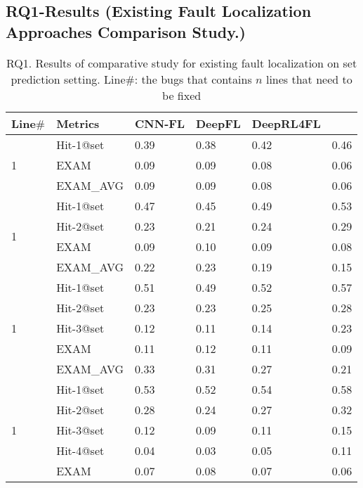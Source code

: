 \subsection{RQ1-Results ({\bf Existing Fault Localization Approaches Comparison Study.})}

\begin{table}[h]
	\caption{RQ1. Results of comparative study for existing fault localization on set prediction setting. Line$\#$: the bugs that contains $n$ lines that need to be fixed}
	{\small
		\begin{center}
			\renewcommand{\arraystretch}{1}
			\begin{tabular}{p{0.5cm}<{\centering}|p{1.5cm}<{\centering}|p{1cm}<{\centering}|p{0.8cm}<{\centering}|p{1.2cm}<{\centering}|p{1.2cm}<{\centering}}
				\hline
				Line$\#$ & Metrics & CNN-FL & DeepFL & DeepRL4FL & \tool \\
				\hline
				\multirow{3}{*}{1}   & Hit-1@set     & 0.39 & 0.38 & 0.42 & 0.46 \\
							    	 & EXAM          & 0.09 & 0.09 & 0.08 & 0.06 \\
									 & EXAM\_AVG     & 0.09 & 0.09 & 0.08 & 0.06 \\
				\hline
				\multirow{4}{*}{1}  & Hit-1@set     & 0.47 & 0.45 & 0.49 & 0.53 \\
									& Hit-2@set     & 0.23 & 0.21 & 0.24 & 0.29 \\
								   	& EXAM          & 0.09 & 0.10 & 0.09 & 0.08 \\
			                     	& EXAM\_AVG     & 0.22 & 0.23 & 0.19 & 0.15 \\
				\hline
				\multirow{5}{*}{1}  & Hit-1@set     & 0.51 & 0.49 & 0.52 & 0.57 \\
									& Hit-2@set     & 0.23 & 0.23 & 0.25 & 0.28 \\
									& Hit-3@set     & 0.12 & 0.11 & 0.14 & 0.23 \\
									& EXAM          & 0.11 & 0.12 & 0.11 & 0.09 \\
									& EXAM\_AVG     & 0.33 & 0.31 & 0.27 & 0.21 \\
				\hline
				\multirow{6}{*}{1}  & Hit-1@set     & 0.53 & 0.52 & 0.54 & 0.58 \\
									& Hit-2@set     & 0.28 & 0.24 & 0.27 & 0.32 \\
									& Hit-3@set     & 0.12 & 0.09 & 0.11 & 0.15 \\
									& Hit-4@set     & 0.04 & 0.03 & 0.05 & 0.11 \\
									& EXAM          & 0.07 & 0.08 & 0.07 & 0.06 \\

\end{tabular}
\end{center}}
\end{table}
